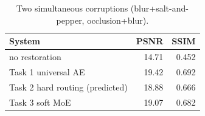\begin{table}[t]
\centering
\caption{Two simultaneous corruptions (blur+salt-and-pepper, occlusion+blur).}
\label{tab:t3_mixed}
\footnotesize
\begin{tabular}{lrr}
\toprule
System & PSNR & SSIM \\
\midrule
no restoration & 14.71 & 0.452 \\
Task 1 universal AE & 19.42 & 0.692 \\
Task 2 hard routing (predicted) & 18.88 & 0.666 \\
Task 3 soft MoE & 19.07 & 0.682 \\
\bottomrule
\end{tabular}
\end{table}
